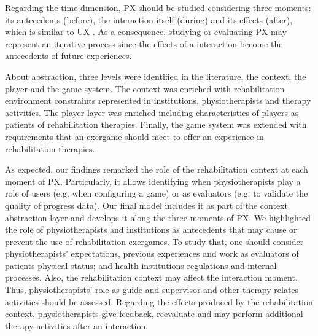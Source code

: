 Regarding the time dimension, \ac{PX} should be studied considering three moments: its antecedents (before), the interaction itself (during) and its effects (after), which is similar to \ac{UX} \autocite{iso9241:210}. As a consequence, studying or evaluating \ac{PX} may represent an iterative process since the effects of a interaction become the antecedents of future experiences.

About abstraction, three levels were identified in the literature, the context, the player and the game system. The context was enriched with rehabilitation environment constraints represented in institutions, physiotherapists and therapy activities.  The player layer was enriched including characteristics of players as patients of rehabilitation therapies.  Finally, the game system was extended with requirements that an exergame should meet to offer an experience in rehabilitation therapies.

As expected, our findings remarked the role of the rehabilitation context at each moment of \ac{PX}. Particularly, it allows identifying when physiotherapists play a role of users (e.g. when configuring a game) or as evaluators (e.g. to validate the quality of progress data). Our final model includes it as part of the context abstraction layer and develops it along the three moments of \ac{PX}. We highlighted the role of physiotherapists and institutions as antecedents that may cause or prevent the use of rehabilitation exergames. To study that, one should consider physiotherapists' expectations, previous experiences and work as evaluators of patients physical status; and health institutions regulations and internal processes. Also, the rehabilitation context may affect the interaction moment. Thus, physiotherapists' role as guide and supervisor and other therapy relates activities should be assessed.  Regarding the effects produced by the rehabilitation context, physiotherapists give feedback, reevaluate and may perform additional therapy activities after an interaction.

